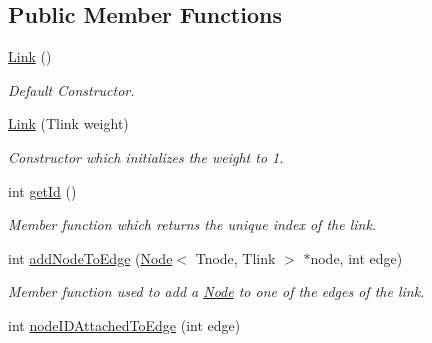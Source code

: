 \subsection*{Public Member Functions}
\begin{DoxyCompactItemize}
\item 
\hyperlink{classLink_aca77f38ecd59de8d21990ac5bbf91a8e}{Link} ()
\begin{DoxyCompactList}\small\item\em Default Constructor. \end{DoxyCompactList}\item 
\hypertarget{classLink_ac99228207446f193a5e4736c6aeb6954}{\hyperlink{classLink_ac99228207446f193a5e4736c6aeb6954}{Link} (Tlink weight)}\label{classLink_ac99228207446f193a5e4736c6aeb6954}

\begin{DoxyCompactList}\small\item\em Constructor which initializes the weight to 1. \end{DoxyCompactList}\item 
int \hyperlink{classLink_ae082bdae9da5f4c58d91c52af2ea4514}{get\+Id} ()
\begin{DoxyCompactList}\small\item\em Member function which returns the unique index of the link. \end{DoxyCompactList}\item 
\hypertarget{classLink_aab3ab85eaf576b6eec5634ef542f736f}{int \hyperlink{classLink_aab3ab85eaf576b6eec5634ef542f736f}{add\+Node\+To\+Edge} (\hyperlink{classNode}{Node}$<$ Tnode, Tlink $>$ $\ast$node, int edge)}\label{classLink_aab3ab85eaf576b6eec5634ef542f736f}

\begin{DoxyCompactList}\small\item\em Member function used to add a \hyperlink{classNode}{Node} to one of the edges of the link. \end{DoxyCompactList}\item 
\hypertarget{classLink_ac932e7b1a57c0c9599be513a2106970b}{int \hyperlink{classLink_ac932e7b1a57c0c9599be513a2106970b}{node\+I\+D\+Attached\+To\+Edge} (int edge)}\label{classLink_ac932e7b1a57c0c9599be513a2106970b}


\end{DoxyCompactItemize}

